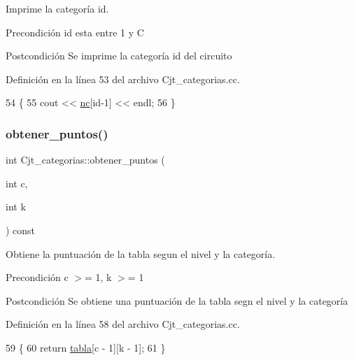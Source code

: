 Imprime la categoría id. 

\begin{DoxyPrecond}{Precondición}
id esta entre 1 y C 
\end{DoxyPrecond}
\begin{DoxyPostcond}{Postcondición}
Se imprime la categoría id del circuito 
\end{DoxyPostcond}


Definición en la línea 53 del archivo Cjt\+\_\+categorias.\+cc.


\begin{DoxyCode}
54 \{
55     cout << \hyperlink{class_cjt__categorias_aad3febb4a17038ba65b2f79a4a509289}{nc}[\textcolor{keywordtype}{id}-1] << endl;
56 \}
\end{DoxyCode}
\mbox{\label{class_cjt__categorias_abddf6d1471987a718e12485f58b95c1b}} 
\subsubsection{\texorpdfstring{obtener\+\_\+puntos()}{obtener\_puntos()}}
{\footnotesize\ttfamily int Cjt\+\_\+categorias\+::obtener\+\_\+puntos (\begin{DoxyParamCaption}\item[{int}]{c,  }\item[{int}]{k }\end{DoxyParamCaption}) const}



Obtiene la puntuación de la tabla segun el nivel y la categoría. 

\begin{DoxyPrecond}{Precondición}
c $>$= 1, k $>$= 1 
\end{DoxyPrecond}
\begin{DoxyPostcond}{Postcondición}
Se obtiene una puntuación de la tabla segn el nivel y la categoría 
\end{DoxyPostcond}


Definición en la línea 58 del archivo Cjt\+\_\+categorias.\+cc.


\begin{DoxyCode}
59 \{
60     \textcolor{keywordflow}{return} \hyperlink{class_cjt__categorias_af03722d79d2b1ec784954dd13a7168eb}{tabla}[c - 1][k - 1];
61 \}
\end{DoxyCode}


